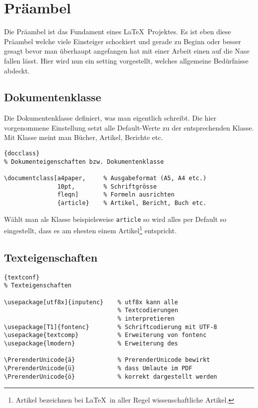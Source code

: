 \section{Präambel}
\noindent
Die Präambel ist das Fundament eines \LaTeX~Projektes. Es
ist eben diese Präambel welche viele Einsteiger schockiert
und gerade zu Beginn oder besser gesagt bevor man überhaupt
angefangen hat mit einer Arbeit einen auf die Nase fallen
lässt. Hier wird nun ein setting vorgestellt, welches
allgemeine Bedürfnisse abdeckt.

\subsection{Dokumentenklasse}

Die Dokumentenklasse definiert, was man eigentlich
schreibt. Die hier vorgenommene Einstellung setzt alle
Default-Werte zu der entsprechenden Klasse. Mit Klasse
meint man Bücher, Artikel, Berichte etc.

\begin{center}
\begin{lstlisting}[caption=Dokumentenklasse]{docclass}
% Dokumenteigenschaften bzw. Dokumentenklasse

\documentclass[a4paper,     % Ausgabeformat (A5, A4 etc.)
               10pt,        % Schriftgrösse
               fleqn]       % Formeln ausrichten
               {article}    % Artikel, Bericht, Buch etc.
\end{lstlisting}
\end{center}

\noindent
Wählt man als Klasse beispielsweise \lstinline|article| so
wird alles per Default so eingestellt, dass es am ehesten
einem Artikel\footnote{Artikel bezeichnen bei \LaTeX~in
aller Regel wissenschaftliche Artikel.} entspricht.

\subsection{Texteigenschaften}

\begin{center}
\begin{lstlisting}[caption=Texteigenschaften]{textconf}
% Texteigenschaften

\usepackage[utf8x]{inputenc}    % utf8x kann alle
                                % Textcodierungen
                                % interpretieren
\usepackage[T1]{fontenc}        % Schriftcodierung mit UTF-8
\usepackage{textcomp}           % Erweiterung von fontenc
\usepackage{lmodern}            % Erweiterung des

\PrerenderUnicode{ä}            % PrerenderUnicode bewirkt
\PrerenderUnicode{ü}            % dass Umlaute im PDF 
\PrerenderUnicode{ö}            % korrekt dargestellt werden
\end{lstlisting}
\end{center}

